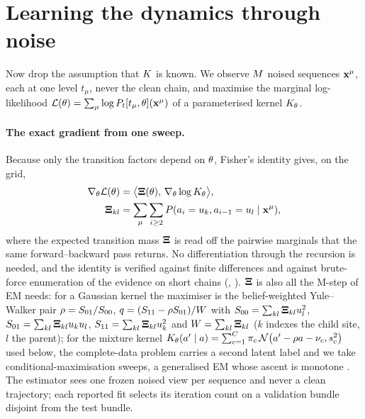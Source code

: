 \section{Learning the dynamics through noise}
\label{sec:learning}

Now drop the assumption that $K$ is known. We observe $M$ noised sequences
$\mathbf{x}^{\mu}$, each at one level $t_\mu$, never the clean chain, and maximise the marginal
log-likelihood $\mathcal{L}(\theta)=\sum_\mu\log P_t[t_\mu,\theta](\mathbf{x}^\mu)$ of a
parameterised kernel $K_{\theta}$.

\paragraph{The exact gradient from one sweep.}
Because only the transition factors depend on $\theta$, Fisher's identity
\citep{cappe2005} gives, on the grid,
\begin{equation}
\begin{aligned}
  \nabla_\theta\mathcal{L}(\theta)&=\bigl\langle\mathbf{\Xi}(\theta),\,\nabla_\theta\log K_{\theta}\bigr\rangle,\\
  \mathbf{\Xi}_{kl}&=\sum_{\mu}\sum_{i\ge2}P(a_i=u_{k},a_{i-1}=u_{l}\mid\mathbf{x}^\mu),
\end{aligned}
\label{eq:fisher}
\end{equation}
where the expected transition mass $\mathbf{\Xi}$ is read off the pairwise marginals that the
same forward--backward pass returns. No differentiation through the recursion is needed,
and the identity is verified against finite differences and against brute-force
enumeration of the evidence on short chains (,
). $\mathbf{\Xi}$ is also all the M-step of EM needs: for a Gaussian kernel
the maximiser is the belief-weighted Yule--Walker pair
$\rho=S_{01}/S_{00}$, $q=(S_{11}-\rho S_{01})/W$ with
$S_{00}=\sum_{kl}\mathbf{\Xi}_{kl}u_{l}^2$, $S_{01}=\sum_{kl}\mathbf{\Xi}_{kl}u_{k}u_{l}$,
$S_{11}=\sum_{kl}\mathbf{\Xi}_{kl}u_{k}^2$ and $W=\sum_{kl}\mathbf{\Xi}_{kl}$ ($k$ indexes the child
site, $l$ the parent); for the mixture kernel
$K_{\theta}(a'\mid a)=\sum_{c=1}^{C}\pi_c\,\mathcal{N}\!\left(a'-\rho a-\nu_c,s_c^2\right)$ used below,
the complete-data problem carries a second latent label and we take conditional-maximisation
sweeps, a generalised EM whose ascent is monotone \citep{dempster1977maximum,meng1993maximum}. The
estimator sees one frozen noised view per sequence and never a clean trajectory; each
reported fit selects its iteration count on a validation bundle disjoint from the test
bundle.


